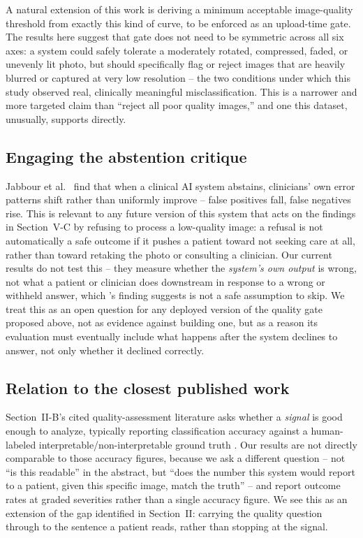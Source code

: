 \documentclass[conference]{IEEEtran}
\begin{document}
A natural extension of this work is deriving a minimum acceptable image-quality
threshold from exactly this kind of curve, to be enforced as an upload-time gate. The
results here suggest that gate does not need to be symmetric across all six axes: a
system could safely tolerate a moderately rotated, compressed, faded, or unevenly lit
photo, but should specifically flag or reject images that are heavily blurred or
captured at very low resolution -- the two conditions under which this study observed
real, clinically meaningful misclassification. This is a narrower and more targeted
claim than ``reject all poor quality images,'' and one this dataset, unusually,
supports directly.

\subsection{Engaging the abstention critique}

Jabbour et al.\ \cite{ref26} find that when a clinical AI system abstains,
clinicians' own error patterns shift rather than uniformly improve -- false positives
fall, false negatives rise. This is relevant to any future version of this system
that acts on the findings in Section~V-C by refusing to process a low-quality image:
a refusal is not automatically a safe outcome if it pushes a patient toward not
seeking care at all, rather than toward retaking the photo or consulting a clinician.
Our current results do not test this -- they measure whether the \emph{system's own
output} is wrong, not what a patient or clinician does downstream in response to a
wrong or withheld answer, which \cite{ref26}'s finding suggests is not a safe
assumption to skip. We treat this as an open question for any deployed version of the
quality gate proposed above, not as evidence against building one, but as a reason
its evaluation must eventually include what happens after the system declines to
answer, not only whether it declined correctly.

\subsection{Relation to the closest published work}

Section~II-B's cited quality-assessment literature asks whether a \emph{signal} is
good enough to analyze, typically reporting classification accuracy against a
human-labeled interpretable/non-interpretable ground truth \cite{ref12,ref13,ref14,ref15,ref16,ref17,ref18,ref19,ref20,ref21,ref22}.
Our results are not directly comparable to those accuracy figures, because we ask a
different question -- not ``is this readable'' in the abstract, but ``does the
number this system would report to a patient, given this specific image, match the
truth'' -- and report outcome rates at graded severities rather than a single
accuracy figure. We see this as an extension of the gap identified in Section~II:
carrying the quality question through to the sentence a patient reads, rather than
stopping at the signal.
\end{document}
